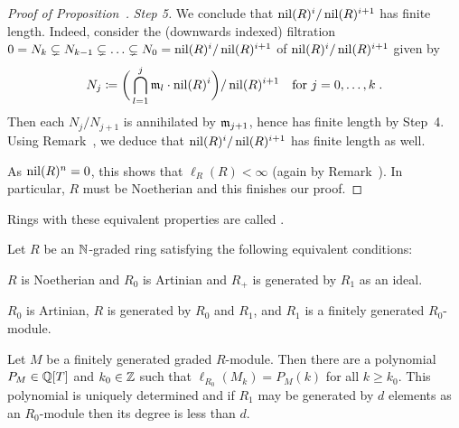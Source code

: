 \documentclass[a4paper,parskip=half,numbers=enddot, DIV=12]{scrreprt}
\begin{document}
\begin{proof}[Proof of Proposition~]
    \emph{Step 5.} We conclude that $\operatorname{nil}(R)^i/\operatorname{nil}(R)^{i+1}$ has finite length. Indeed, consider the (downwards indexed) filtration $0=N_k\subsetneq N_{k-1}\subsetneq \ldots\subsetneq N_0=\operatorname{nil}(R)^i/\operatorname{nil}(R)^{i+1}$ of $\operatorname{nil}(R)^i/\operatorname{nil}(R)^{i+1}$ given by
    \begin{align*}
        N_j\coloneqq\bigg(\bigcap_{l=1}^j\mathfrak{m}_l\cdot\operatorname{nil}(R)^i\bigg) /\operatorname{nil}(R)^{i+1}\quad\text{for }j=0,\ldots,k\;.
    \end{align*}
    Then each $N_j/N_{j+1}$  is annihilated by $\mathfrak{m}_{j+1}$, hence has finite length by Step~4.  Using Remark~, we deduce that $\operatorname{nil}(R)^i/\operatorname{nil}(R)^{i+1}$ has finite length as well.
    
    As $\operatorname{nil}(R)^n=0$, this shows that $\ell_R(R) <\infty$ (again by Remark~). In particular, $R$ must be Noetherian and this finishes our proof.
\end{proof}

\begin{defi}[Artinian]
    Rings with these equivalent properties are called .
\end{defi}
\begin{thm}
    Let $R$ be an $\mathbb{N}$-graded ring satisfying the following equivalent conditions:
    \begin{alphanumerate}
    \item 
        $R$ is Noetherian and $R_0$ is Artinian and $R_+$ is generated by $R_1$ as an ideal.
    \item 
        $R_0$ is Artinian, $R$ is generated by $R_0$ and $R_1$, and $R_1$ is a finitely generated $R_0$-module.
    \end{alphanumerate}
    Let $M$ be a finitely generated graded $R$-module. Then there are a polynomial $P_M\in \mathbb{Q}[T]$ and $k_0\in\mathbb{Z}$ such that $\ell_{R_0}(M_k) = P_M(k)$ for all $k\geq k_0$. This polynomial is uniquely determined and if $R_1$ may be generated by $d$ elements as an $R_0$-module then its degree is less than $d$.
\end{thm}
\end{document}
